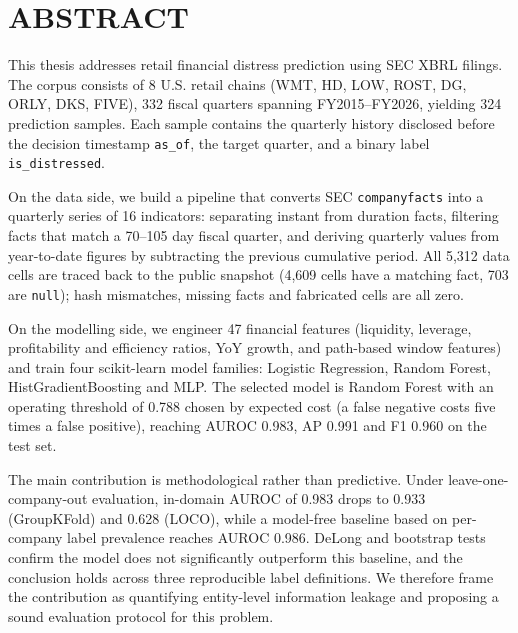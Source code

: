 \documentclass[13pt,a4paper]{extreport}
\begin{document}
\chapter*{ABSTRACT}
This thesis addresses retail financial distress prediction using SEC XBRL filings. The corpus
consists of 8 U.S. retail chains (WMT, HD, LOW, ROST, DG, ORLY, DKS, FIVE), 332 fiscal quarters
spanning FY2015--FY2026, yielding 324 prediction samples. Each sample contains the quarterly
history disclosed before the decision timestamp \texttt{as\_of}, the target quarter, and a binary
label \texttt{is\_distressed}.

On the data side, we build a pipeline that converts SEC \texttt{companyfacts} into a quarterly
series of 16 indicators: separating instant from duration facts, filtering facts that match a
70--105 day fiscal quarter, and deriving quarterly values from year-to-date figures by subtracting
the previous cumulative period. All 5,312 data cells are traced back to the public snapshot
(4,609 cells have a matching fact, 703 are \texttt{null}); hash mismatches, missing facts and
fabricated cells are all zero.

On the modelling side, we engineer 47 financial features (liquidity, leverage, profitability and
efficiency ratios, YoY growth, and path-based window features) and train four scikit-learn model
families: Logistic Regression, Random Forest, HistGradientBoosting and MLP. The selected model is
Random Forest with an operating threshold of 0.788 chosen by expected cost (a false negative costs
five times a false positive), reaching AUROC 0.983, AP 0.991 and F1 0.960 on the test set.

The main contribution is methodological rather than predictive. Under leave-one-company-out
evaluation, in-domain AUROC of 0.983 drops to 0.933 (GroupKFold) and 0.628 (LOCO), while a
model-free baseline based on per-company label prevalence reaches AUROC 0.986. DeLong and bootstrap
tests confirm the model does not significantly outperform this baseline, and the conclusion holds
across three reproducible label definitions. We therefore frame the contribution as quantifying
entity-level information leakage and proposing a sound evaluation protocol for this problem.
\clearpage







\clearpage
{}
{}




\end{document}
